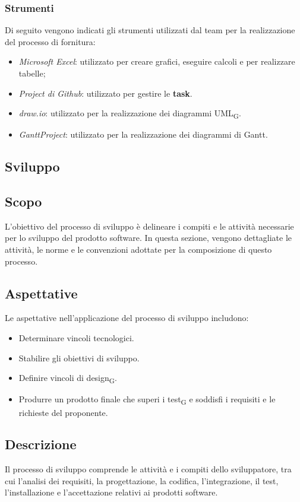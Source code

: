 \documentclass{article}
\begin{document}
\subsubsection*{Strumenti}
Di seguito vengono indicati gli strumenti utilizzati dal team per la realizzazione del processo di fornitura:\begin{itemize}
    \item \textit{Microsoft Excel}: utilizzato per creare grafici, eseguire calcoli e per realizzare tabelle;
    \item \textit{Project di Github}: utilizzato per gestire le \textbf{task}.
    \item \textit{draw.io}: utilizzato per la realizzazione dei diagrammi UML\textsubscript{G}.
    \item \textit{GanttProject}: utilizzato per la realizzazione dei diagrammi di Gantt.
\end{itemize}

\subsection{Sviluppo}

\subsection{Scopo}
L'obiettivo del processo di sviluppo è delineare i compiti e le attività necessarie per lo sviluppo del prodotto software. In questa sezione, vengono dettagliate le attività, le norme e le convenzioni adottate per la composizione di questo processo.

\subsection{Aspettative}
Le aspettative nell'applicazione del processo di sviluppo includono:
\begin{itemize}
    \item Determinare vincoli tecnologici.
    \item Stabilire gli obiettivi di sviluppo.
    \item Definire vincoli di design\textsubscript{G}.
    \item Produrre un prodotto finale che superi i test\textsubscript{G} e soddisfi i requisiti e le richieste del proponente.
\end{itemize}

\subsection{Descrizione}
Il processo di sviluppo comprende le attività e i compiti dello sviluppatore, tra cui l'analisi dei requisiti, la progettazione, la codifica, l'integrazione, il test, l'installazione e l'accettazione relativi ai prodotti software.
\end{document}
